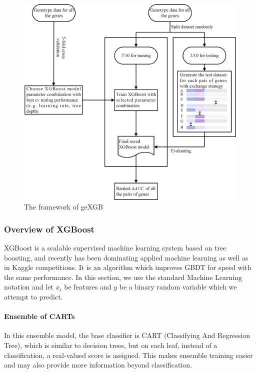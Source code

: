 \documentclass[11pt]{article}
\theoremstyle{plain}
\theoremstyle{definition}
\theoremstyle{remark}
\begin{document}
\begin{figure}[H]
    \begin{center}
       \includegraphics[scale=0.6]{framework_0116.png}
    \end{center}
\caption{\label{det}The framework of geXGB}
\end{figure}

\subsubsection{Overview of XGBoost}

XGBoost \cite{9} is a scalable supervised machine learning system based on tree boosting, and recently has been dominating applied machine learning as well as in Kaggle competitions. It is an algorithm which improves GBDT for speed with the same performance. In this section, we use the standard Machine Learning notation and let $x_i$ be features and $y$ be a binary random variable which we attempt to predict.

\paragraph{Ensemble of CARTs}
In this ensemble model, the base classifier is CART (Classifying And Regression Tree), which is similar to decision trees, but on each leaf, instead of a classification, a real-valued score is assigned. This makes ensemble training easier and may also provide more information beyond classification.\\
\end{document}
